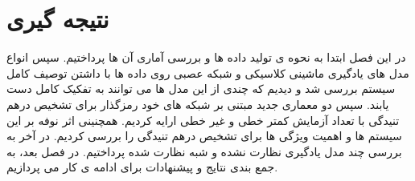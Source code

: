 \section{نتیجه گیری}

در این فصل ابتدا به نحوه ی تولید داده ها و بررسی آماری آن ها پرداختیم. سپس انواع مدل های یادگیری ماشینی کلاسیکی و شبکه عصبی روی داده ها با داشتن توصیف کامل سیستم بررسی شد و دیدیم که چندی از این مدل ها می توانند به تفکیک کامل دست یابند. سپس دو معماری جدید مبتنی بر شبکه های خود رمزگذار برای تشخیص درهم تنیدگی با تعداد آزمایش کمتر خطی و غیر خطی ارایه کردیم. همچنینی اثر نوفه بر این سیستم ها و اهمیت ویژگی ها برای تشخیص درهم تنیدگی را بررسی کردیم. در آخر به بررسی چند مدل یادگیری نظارت نشده و شبه نظارت شده پرداختیم. در فصل بعد، به جمع بندی نتایج و پیشنهادات برای ادامه ی کار می پردازیم.
